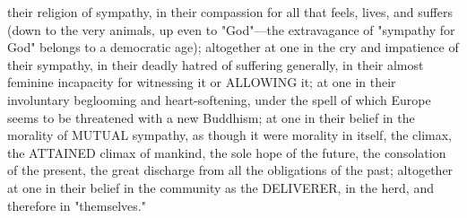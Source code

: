 \documentclass[12pt]{article}
\begin{document}
their religion of sympathy, in their compassion for all that feels, lives, and suffers (down to the very animals, up even to "God"---the extravagance of "sympathy for God" belongs to a democratic age); altogether at one in the cry and impatience of their sympathy, in their deadly hatred of suffering generally, in their almost feminine incapacity for witnessing it or ALLOWING it; at one in their involuntary beglooming and heart-softening, under the spell of which Europe seems to be threatened with a new Buddhism; at one in their belief in the morality of MUTUAL sympathy, as though it were morality in itself, the climax, the ATTAINED climax of mankind, the sole hope of the future, the consolation of the present, the great discharge from all the obligations of the past; altogether at one in their belief in the community as the DELIVERER, in the herd, and therefore in "themselves."
\end{document}
